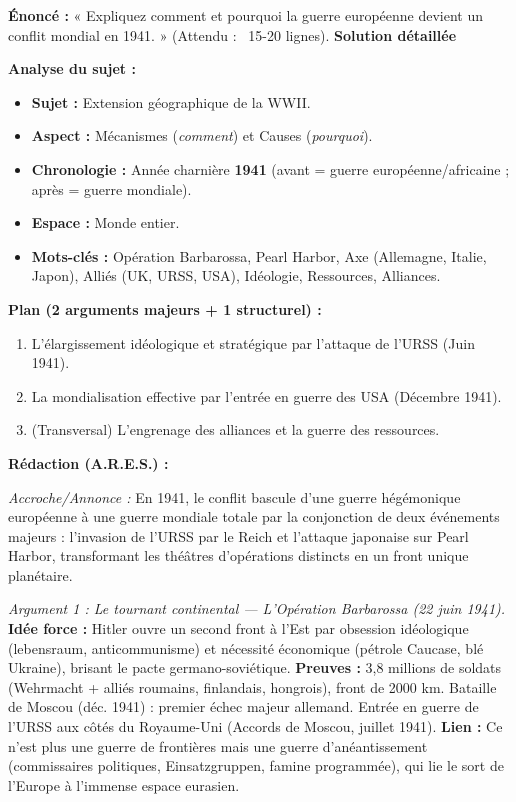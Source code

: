 \documentclass[11pt]{article}
\newcommand{\cle}[1]{{\popxbold\color{popdark}#1}}
\begin{document}
\begin{exoresolu}
\textbf{Énoncé :} « Expliquez comment et pourquoi la guerre européenne devient un conflit mondial en 1941. » (Attendu : ~15-20 lignes).
\tcblower
\textbf{Solution détaillée}

\textbf{Analyse du sujet :}
\begin{itemize}
    \item \textbf{Sujet :} Extension géographique de la WWII.
    \item \textbf{Aspect :} Mécanismes (\textit{comment}) et Causes (\textit{pourquoi}).
    \item \textbf{Chronologie :} Année charnière \textbf{1941} (avant = guerre européenne/africaine ; après = guerre mondiale).
    \item \textbf{Espace :} Monde entier.
    \item \textbf{Mots-clés :} Opération Barbarossa, Pearl Harbor, Axe (Allemagne, Italie, Japon), Alliés (UK, URSS, USA), Idéologie, Ressources, Alliances.
\end{itemize}

\textbf{Plan (2 arguments majeurs + 1 structurel) :}
\begin{enumerate}
    \item L'élargissement idéologique et stratégique par l'attaque de l'URSS (Juin 1941).
    \item La mondialisation effective par l'entrée en guerre des USA (Décembre 1941).
    \item (Transversal) L'engrenage des alliances et la guerre des ressources.
\end{enumerate}

\textbf{Rédaction (A.R.E.S.) :}

\textit{Accroche/Annonce :} En 1941, le conflit bascule d'une guerre hégémonique européenne à une \cle{guerre mondiale} totale par la conjonction de deux événements majeurs : l'invasion de l'URSS par le Reich et l'attaque japonaise sur Pearl Harbor, transformant les théâtres d'opérations distincts en un front unique planétaire.

\textit{Argument 1 : Le tournant continental — L'Opération Barbarossa (22 juin 1941).}
\textbf{Idée force :} Hitler ouvre un second front à l'Est par obsession idéologique (\cle{lebensraum}, anticommunisme) et nécessité économique (pétrole Caucase, blé Ukraine), brisant le pacte germano-soviétique.
\textbf{Preuves :} 3,8 millions de soldats (Wehrmacht + alliés roumains, finlandais, hongrois), front de 2000 km. Bataille de \cle{Moscou} (déc. 1941) : premier échec majeur allemand. Entrée en guerre de l'URSS aux côtés du Royaume-Uni (Accords de Moscou, juillet 1941).
\textbf{Lien :} Ce n'est plus une guerre de frontières mais une \cle{guerre d'anéantissement} (commissaires politiques, Einsatzgruppen, famine programmée), qui lie le sort de l'Europe à l'immense espace eurasien.


\end{exoresolu}
\end{document}
